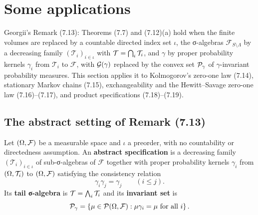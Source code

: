 \section{Some applications}

Georgii's Remark (7.13): Theorems (7.7) and (7.12)(a) hold when the finite volumes are replaced
by a countable directed index set $\iota$, the σ-algebras $\mathcal{F}_{S \setminus \Lambda}$ by
a decreasing family $(\mathcal{T}_i)_{i \in \iota}$ with $\mathcal{T} = \bigcap_i \mathcal{T}_i$, and
$\gamma$ by proper probability kernels $\gamma_i$ from $\mathcal{T}_i$ to $\mathcal{F}$, with
$\mathcal{G}(\gamma)$ replaced by the convex set $\mathcal{P}_\gamma$ of $\gamma$-invariant probability
measures.  This section applies it to Kolmogorov's zero-one law (7.14), stationary Markov chains
(7.15), exchangeability and the Hewitt--Savage zero-one law (7.16)--(7.17), and product
specifications (7.18)--(7.19).

\subsection*{The abstract setting of Remark (7.13)}

\begin{definition}
    \label{def:app-abstract-spec}
    \leanok

    Let $(\Omega, \mathcal{F})$ be a measurable space and $\iota$ a preorder, with no countability
    or directedness assumption.  An \textbf{abstract specification} is a decreasing family
    $(\mathcal{T}_i)_{i \in \iota}$ of sub-σ-algebras of $\mathcal{F}$ together with proper
    probability kernels $\gamma_i$ from $(\Omega, \mathcal{T}_i)$ to $(\Omega, \mathcal{F})$
    satisfying the consistency relation
    \[\gamma_i \gamma_j = \gamma_j \qquad (i \le j).\]
    Its \textbf{tail σ-algebra} is $\mathcal{T} = \bigwedge_{i} \mathcal{T}_i$ and its
    \textbf{invariant set} is
    \[\mathcal{P}_\gamma = \left\{ \mu \in \mathcal{P}(\Omega, \mathcal{F}) : \mu\gamma_i = \mu \text{ for all } i \right\}.\]
\end{definition}

